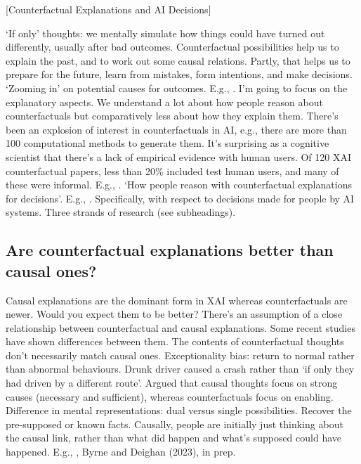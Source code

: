 [Counterfactual Explanations and AI Decisions]

\begin{affils}
\end{affils}

`If only' thoughts: we mentally simulate how things could have turned out differently,
usually after bad outcomes.
Counterfactual possibilities help us to explain the past, and to work out some causal
relations.
Partly, that helps us to prepare for the future, learn from mistakes, form intentions,
and make decisions.
`Zooming in' on potential causes for outcomes.
E.g., \textcites{Kahneman1982}{Roese2017}{Byrne2016}.
I'm going to focus on the explanatory aspects.
We understand a lot about how people reason about counterfactuals but comparatively
less about how they explain them.
There's been an explosion of interest in counterfactuals in AI, e.g., there are more
than 100 computational methods to generate them.
It's surprising as a cognitive scientist that there's a lack of empirical evidence with
human users.
Of 120 XAI counterfactual papers, less than 20\% included test human users, and many of
these were informal.
E.g., \textcites{Wachter2017}{Karimi2020}{Keane2021}.
`How people reason with counterfactual explanations for decisions'.
E.g., \textcites{Warren2023}.
Specifically, with respect to decisions made for people by AI systems.
Three strands of research (see subheadings).

\subsection*{Are counterfactual explanations better than causal ones?}

Causal explanations are the dominant form in XAI whereas counterfactuals are newer.
Would you expect them to be better?
There's an assumption of a close relationship between counterfactual and causal
explanations.
Some recent studies have shown differences between them.
The contents of counterfactual thoughts don't necessarily match causal ones.
Exceptionality bias: return to normal rather than abnormal behaviours.
Drunk driver caused a crash rather than `if only they had driven by a different route'.
Argued that causal thoughts focus on strong causes (necessary and sufficient), whereas
counterfactuals focus on enabling.
Difference in mental representations: dual versus single possibilities.
Recover the pre-supposed or known facts.
Causally, people are initially just thinking about the causal link, rather than what
did happen and what's supposed could have happened.
E.g., \textcites{Kahneman1982}{Mandel1996}, Byrne and Deighan (2023), in prep.

